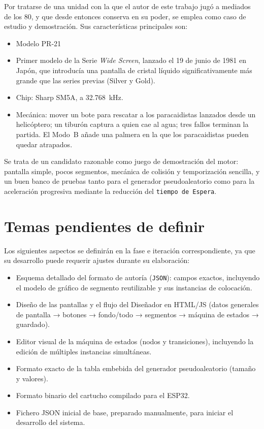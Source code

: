 \documentclass[../main.tex]{subfiles}
\begin{document}
	Por tratarse de una unidad con la que el autor de este trabajo jugó a mediados de los 80, y que desde entonces conserva en su poder, se emplea como  caso de estudio y demostración. Sus características principales son:

	\begin{itemize}
		\item Modelo PR-21
		\item Primer modelo de la Serie \textit{Wide Screen}, lanzado el 19 de junio de 1981 en Japón, que introducía una pantalla de cristal líquido significativamente más grande que las series previas (Silver y Gold).
		\item Chip: Sharp SM5A, a 32.768~kHz.
		\item Mecánica: mover un bote para rescatar a los paracaidistas lanzados desde un helicóptero; un tiburón captura a quien cae al agua; tres fallos terminan la partida. El Modo~B añade una palmera en la que los paracaidistas pueden quedar atrapados.
	\end{itemize}

	Se trata de un candidato razonable como juego de demostración del motor: pantalla simple, pocos segmentos, mecánica de colisión y temporización sencilla, y un buen banco de pruebas tanto para el generador pseudoaleatorio como para la aceleración progresiva mediante la reducción del \texttt{tiempo de Espera}.

	\section{Temas pendientes de definir}
	\label{sec:pendientes-disenno}

	Los siguientes aspectos se definirán en la fase e iteración correspondiente, ya que su desarrollo puede requerir ajustes durante su elaboración:

	\begin{itemize}
		\item Esquema detallado del formato de autoría (\texttt{JSON}): campos exactos, incluyendo el modelo de gráfico de segmento reutilizable y sus instancias de colocación.
		\item Diseño de las pantallas y el flujo del Diseñador en HTML/JS (datos generales de pantalla → botones → fondo/todo → segmentos → máquina de estados → guardado).
		\item Editor visual de la máquina de estados (nodos y transiciones), incluyendo la edición de múltiples instancias simultáneas.
		\item Formato exacto de la tabla embebida del generador pseudoaleatorio (tamaño y valores).
		\item Formato binario del cartucho compilado para el ESP32.
		\item Fichero JSON inicial de base, preparado manualmente, para iniciar el desarrollo del sistema.
	\end{itemize}
\end{document}
